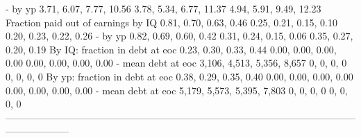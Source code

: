                                - by yp     3.71, 6.07, 7.77, 10.56        3.78, 5.34, 6.77, 11.37        4.94, 5.91, 9.49, 12.23
   Fraction paid out of earnings by IQ      0.81, 0.70, 0.63, 0.46         0.25, 0.21, 0.15, 0.10         0.20, 0.23, 0.22, 0.26
                               - by yp      0.82, 0.69, 0.60, 0.42         0.31, 0.24, 0.15, 0.06         0.35, 0.27, 0.20, 0.19
        By IQ: fraction in debt at eoc      0.23, 0.30, 0.33, 0.44         0.00, 0.00, 0.00, 0.00         0.00, 0.00, 0.00, 0.00
                    - mean debt at eoc  3,106, 4,513, 5,356, 8,657                     0, 0, 0, 0                     0, 0, 0, 0
        By yp: fraction in debt at eoc      0.38, 0.29, 0.35, 0.40         0.00, 0.00, 0.00, 0.00         0.00, 0.00, 0.00, 0.00
                    - mean debt at eoc  5,179, 5,573, 5,395, 7,803                     0, 0, 0, 0                     0, 0, 0, 0
--------------------------------------------------------------------------------------------------------------------------------

